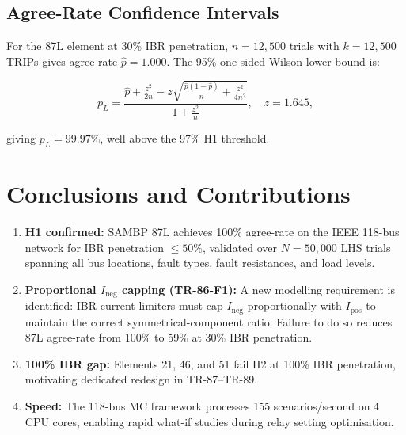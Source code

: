 \documentclass[11pt,a4paper]{article}
\begin{document}
\subsection{Agree-Rate Confidence Intervals}

For the 87L element at 30\% IBR penetration, $n = 12{,}500$ trials with
$k = 12{,}500$ TRIPs gives agree-rate $\hat{p} = 1.000$.  The 95\%
one-sided Wilson lower bound is:

\begin{equation}
  p_L = \frac{\hat{p} + \frac{z^2}{2n} - z\sqrt{\frac{\hat{p}(1-\hat{p})}{n}
        + \frac{z^2}{4n^2}}}{1 + \frac{z^2}{n}},
  \quad z = 1.645,
  \label{eq:wilson}
\end{equation}

giving $p_L = 99.97\%$, well above the 97\% H1 threshold.

\section{Conclusions and Contributions}
\label{sec:conclusions}

\begin{enumerate}
  \item \textbf{H1 confirmed:} SAMBP 87L achieves 100\% agree-rate on the
        IEEE 118-bus network for IBR penetration $\leq 50\%$, validated
        over $N = 50{,}000$ LHS trials spanning all bus locations, fault
        types, fault resistances, and load levels.

  \item \textbf{Proportional $I_{\text{neg}}$ capping (TR-86-F1):} A new
        modelling requirement is identified: IBR current limiters must cap
        $I_{\text{neg}}$ proportionally with $I_{\text{pos}}$ to maintain
        the correct symmetrical-component ratio.  Failure to do so reduces
        87L agree-rate from 100\% to 59\% at 30\% IBR penetration.

  \item \textbf{100\% IBR gap:} Elements 21, 46, and 51 fail H2 at 100\%
        IBR penetration, motivating dedicated redesign in TR-87--TR-89.

  \item \textbf{Speed:} The 118-bus MC framework processes 155
        scenarios/second on 4 CPU cores, enabling rapid what-if studies
        during relay setting optimisation.
\end{enumerate}
\end{document}
